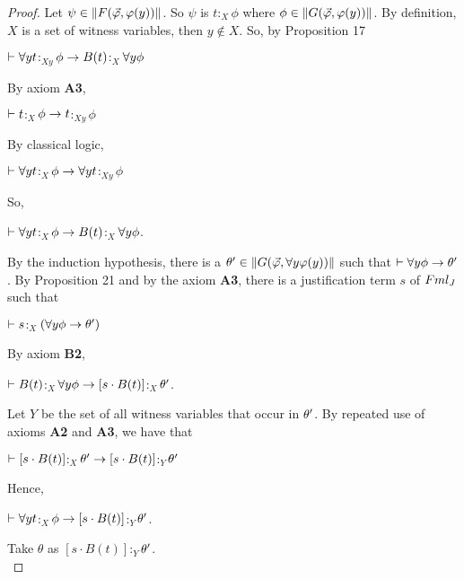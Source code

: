 \begin{proof}
	\qquad Let $\psi \in \Arrowvert F(\vec{\varphi}, \varphi(y)) \Arrowvert$. So $\psi$ is $t$$:_{X}$$\phi$ where $\phi \in \Arrowvert G(\vec{\varphi},\varphi(y)) \Arrowvert$. By definition, $X$ is a set of witness variables, then $y \notin X$. So, by Proposition 17 
	
	
	\begin{center}
		$\vdash \forall y t$$:_{Xy}$$\phi \rightarrow B(t)$$:_{X}$$\forall y \phi$
	\end{center}
By axiom \textbf{A3},
	
	
	\begin{center}
		$\vdash t$$:_{X}$$\phi \rightarrow t$$:_{Xy}$$\phi$
	\end{center}
By classical logic,
	
	
	\begin{center}
		$\vdash \forall y t$$:_{X}$$\phi \rightarrow \forall y t$$:_{Xy}$$\phi$
	\end{center}
So,
	
	\begin{center}
		$\vdash \forall y t$$:_{X}$$\phi \rightarrow B(t)$$:_{X}$$\forall y \phi$.
	\end{center}
	
	\qquad By the induction hypothesis, there is a $\theta^{\prime} \in \Arrowvert G(\vec{\varphi}, \forall y \varphi(y)) \Arrowvert$ such that $\vdash \forall y \phi \rightarrow \theta^{\prime}$. By Proposition 21 and by the axiom \textbf{A3}, there is a justification term $s$ of $Fml_{J}$ such that
	
	\begin{center}
		$\vdash s$$:_{X}$$(\forall y \phi \rightarrow \theta^{\prime})$
	\end{center}    
By axiom \textbf{B2},    
	
	
	\begin{center}
		$\vdash B(t)$$:_{X}$$\forall y \phi \rightarrow [s \cdot B(t)]$$:_{X}$$\theta^{\prime}$.
	\end{center}
	
	\qquad Let $Y$ be the set of all witness variables that occur in $\theta^{\prime}$. By repeated use of axioms \textbf{A2} and \textbf{A3}, we have that
	
	
	\begin{center}
		$\vdash [s \cdot B(t)]$$:_{X}$$\theta^{\prime} \rightarrow  [s \cdot B(t)]$$:_{Y}$$\theta^{\prime}$
	\end{center} 
Hence, 
	
	\begin{center}
		$\vdash \forall y t$$:_{X}$$\phi \rightarrow [s \cdot B(t)]$$:_{Y}$$\theta^{\prime}$.
	\end{center}
	
	\qquad Take $\theta$ as $[s \cdot B(t)]$$:_{Y}$$\theta^{\prime}$.\\    
	
	
	
	
	
\end{proof}



